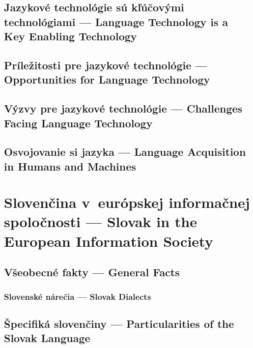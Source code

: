 \documentclass[paper=a4]{scrartcl}
\newcommand{\wpsk}[1]{\ParallelLText{\begin{slovak}\setlength\parindent{1em}\frenchspacing#1\end{slovak}}}
\newcommand{\wpen}[1]{\ParallelRText{\begin{english}\setlength\parindent{0pt}\nonfrenchspacing#1\end{english}}}
\begin{document}
\begin{Parallel}[c]{70mm}{70mm}
\subsection{Jazykové technológie sú kľúčovými technológiami --- Language Technology is a Key Enabling Technology}
\wpsk{}
\wpen{}
\ParallelPar

\subsection{Príležitosti pre jazykové technológie --- Opportunities for Language Technology}
\wpsk{}
\wpen{}
\ParallelPar

\subsection{Výzvy pre jazykové technológie --- Challenges Facing Language Technology}
\wpsk{}
\wpen{}
\ParallelPar

\subsection{Osvojovanie si jazyka --- Language Acquisition in Humans and Machines}
\wpsk{}
\wpen{}
\ParallelPar

\section{Slovenčina v európskej informačnej spoločnosti --- Slovak in the European Information Society}
\subsection{Všeobecné fakty --- General Facts}
\wpsk{}
\wpen{}
\ParallelPar

\subsubsection{Slovenské nárečia --- Slovak Dialects}
\wpsk{}
\wpen{}
\ParallelPar

\subsection{Špecifiká slovenčiny --- Particularities of the Slovak Language}
\wpsk{}
\wpen{}
\ParallelPar


\end{Parallel}
\end{document}
